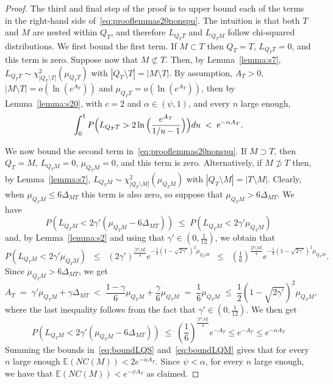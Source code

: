 \documentclass[10pt,a4paper]{amsart}
\newcommand{\E}{\mathbb{E}}
\begin{document}
\begin{proof}
The third and final step of the proof is to upper bound each of the terms in the right-hand side of~\eqref{eq:prooflemmas20nonspu}. The intuition is that both $T$ and $M$ are nested within $Q_T$, and therefore $L_{Q_T T}$ and $L_{Q_T M}$ follow chi-squared distributions.
We first bound the first term. 
If $M \subset T$ then $Q_T=T$, $L_{Q_TT}=0$, and this term is zero. Suppose now that $M \not\subset T$.  
Then, by Lemma~\ref{lemma:s7}, 
$L_{Q_TT} \sim \mathcal{\chi}_{|Q_T\setminus T|}^2(\mu_{Q_TT})$ with $|Q_T\setminus T|=|M\setminus T|$. By assumption, $A_T>0$, $|M\setminus T|=o(\ln(e^{A_T}))$ and $\mu_{Q_TT}=o(\ln(e^{A_T}))$, then by Lemma~\ref{lemma:s20}, with $c=2$ and $\alpha\in(\psi,1)$, and every $n$ large enough,
\begin{equation}\label{eq:boundLQS}
\int_0^1P\Bigl(L_{Q_TT}>2\ln{\Bigl(\frac{e^{A_T}}{1 / u-1}\Bigl)}\Bigl){\rm d}u \;<\; 
e^{-\alpha A_T}.
\end{equation}

We now bound the second term in~\eqref{eq:prooflemmas20nonspu}. If $M \supset T$, then $Q_T=M$, $L_{Q_TM}=0$, $\mu_{Q_TM}=0$, and this term is zero. Alternatively, if $M \not\supset T$
then, by Lemma~\ref{lemma:s7}, $L_{Q_TM} \sim \chi_{|Q_T\setminus M|}^2(\mu_{Q_TM})$ with $|Q_T\setminus M|=|T\setminus M|$.
Clearly, when $\mu_{Q_TM}\leq 6\Delta_{MT}$ this term is also zero, so suppose that $\mu_{Q_TM}> 6\Delta_{MT}$.  
We have  
$$P\left(L_{Q_TM}<2\gamma'(\mu_{Q_TM}-6\Delta_{MT})\right)\; \leq \; P\left(L_{Q_TM}<2\gamma'\mu_{Q_TM}\right)$$ 
and, by Lemma~\ref{lemma:s2} and using that $\gamma'\in (0,\tfrac{1}{12})$, we obtain that 
$$P\left(L_{Q_TM}<2\gamma'\mu_{Q_TM}\right) \;\;\leq\;\; (2\gamma')^{\frac{|T\setminus M|}{4}} e^{-\frac{1}{2}(1-\sqrt{2\gamma'})^2\mu_{Q_TM}}\;\;\leq\;\;  (\tfrac16)^{\frac{|T\setminus M|}{4}}e^{-\frac{1}{2}(1-\sqrt{2\gamma'})^2\mu_{Q_TM}}.$$
Since $\mu_{Q_TM}>6\Delta_{MT}$, we get
$$
A_T\;=\;\gamma'\mu_{Q_TM}+\gamma\Delta_{MT}\;<\;\frac{1-\gamma}{6}\mu_{Q_TM}+\frac{\gamma}{6}\mu_{Q_TM}\;=\;\frac16\mu_{Q_TM}\;\leq\;\frac12(1-\sqrt{2\gamma'})^2\mu_{Q_TM},
$$
where the last inequality follows from the fact that $\gamma'\in(0, \tfrac{1}{12})$. We then get
\begin{equation}\label{eq:boundLQM}
    P\left(L_{Q_TM}<2\gamma'(\mu_{Q_TM}-6\Delta_{MT})\right) \;\leq\; \left(\frac16\right)^{\frac{|T\setminus M|}{4}}e^{-A_T} \leq e^{-A_T}\leq e^{-\alpha A_T}
\end{equation}
Summing the bounds in~\eqref{eq:boundLQS} and~\eqref{eq:boundLQM} gives that for every $n$ large enough $\E\left(NC(M)\right) < 2e^{-\alpha A_T}$. Since $\psi<\alpha$, for every $n$ large enough, we have that $\E\left(NC(M)\right) < e^{-\psi A_T}$ as claimed.
\end{proof}
\end{document}
